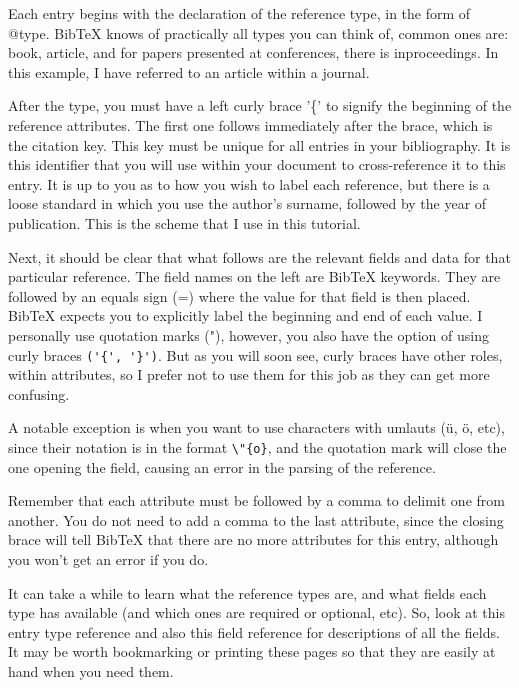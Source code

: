 \begin{refsection}
Each entry begins with the declaration of the reference type, in the form of @type. BibTeX knows of practically all types you can think of, common ones are: book, article, and for papers presented at conferences, there is inproceedings. In this example, I have referred to an article within a journal.


After the type, you must have a left curly brace '\{' to signify the beginning of the reference attributes. The first one follows immediately after the brace, which is the citation key. This key must be unique for all entries in your bibliography. It is this identifier that you will use within your document to cross-reference it to this entry. It is up to you as to how you wish to label each reference, but there is a loose standard in which you use the author's surname, followed by the year of publication. This is the scheme that I use in this tutorial.

Next, it should be clear that what follows are the relevant fields and data for that particular reference. The field names on the left are BibTeX keywords. They are followed by an equals sign (=) where the value for that field is then placed. BibTeX expects you to explicitly label the beginning and end of each value. I personally use quotation marks ("), however, you also have the option of using curly braces \verb+('{', '}')+. But as you will soon see, curly braces have other roles, within attributes, so I prefer not to use them for this job as they can get more confusing. 

A notable exception is when you want to use characters with umlauts (ü, ö, etc), since their notation is in the format \verb+\"{o}+, and the quotation mark will close the one opening the field, causing an error in the parsing of the reference.

Remember that each attribute must be followed by a comma to delimit one from another. You do not need to add a comma to the last attribute, since the closing brace will tell BibTeX that there are no more attributes for this entry, although you won't get an error if you do.

It can take a while to learn what the reference types are, and what fields each type has available (and which ones are required or optional, etc). So, look at this entry type reference and also this field reference for descriptions of all the fields. It may be worth bookmarking or printing these pages so that they are easily at hand when you need them.





\end{refsection}
